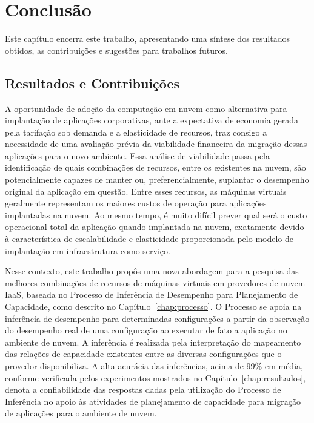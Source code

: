 \chapter{Conclusão}
\label{chap:conclusao}
Este capítulo encerra este trabalho, apresentando uma síntese dos resultados 
obtidos, as contribuições e sugestões para trabalhos futuros.

\section{Resultados e Contribuições}
A oportunidade de adoção da computação em nuvem como alternativa para implantação 
de aplicações corporativas, ante a expectativa de economia gerada pela tarifação 
sob demanda e a elasticidade de recursos, traz consigo a necessidade de uma
avaliação prévia da viabilidade financeira da migração dessas aplicações para
o novo ambiente. Essa análise de viabilidade passa pela identificação de quais 
combinações de recursos, entre os existentes na nuvem, são potencialmente capazes 
de manter ou, preferencialmente, suplantar o desempenho original da aplicação em 
questão. Entre esses recursos, as máquinas virtuais geralmente representam os
maiores custos de operação para aplicações implantadas na nuvem. Ao mesmo tempo,
é muito difícil prever qual será o custo operacional total da aplicação quando
implantada na nuvem, exatamente devido à característica de escalabilidade e 
elasticidade proporcionada pelo modelo de implantação em infraestrutura como
serviço.

Nesse contexto, este trabalho propôs uma nova abordagem para a pesquisa das 
melhores combinações de recursos de máquinas virtuais em provedores de nuvem IaaS,
baseada no Processo de Inferência de Desempenho para Planejamento de
Capacidade, como descrito no Capítulo~\ref{chap:processo}. O Processo se apoia
na inferência de desempenho para determinadas configurações a partir da observação
do desempenho real de uma configuração ao executar de fato a aplicação no
ambiente de nuvem. A inferência é realizada pela interpretação do mapeamento das 
relações de capacidade existentes entre as diversas configurações que o provedor 
disponibiliza. A alta acurácia das inferências, acima de 99\% em média, conforme 
verificada pelos experimentos mostrados no Capítulo~\ref{chap:resultados}, denota 
a confiabilidade das respostas dadas pela utilização do Processo de Inferência 
no apoio às atividades de planejamento de capacidade para migração de aplicações 
para o ambiente de nuvem. 

